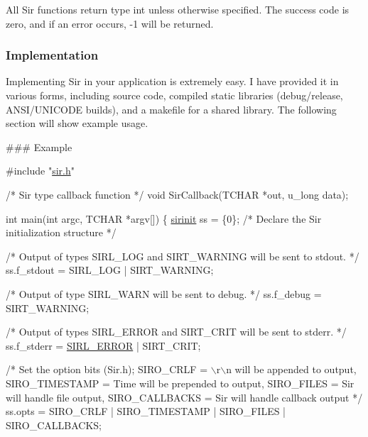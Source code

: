 All Sir functions return type int unless otherwise specified. The success code is zero, and if an error occurs, -\/1 will be returned.

\subsubsection*{Implementation}

Implementing Sir in your application is extremely easy. I have provided it in various forms, including source code, compiled static libraries (debug/release, A\+N\+S\+I/\+U\+N\+I\+C\+O\+DE builds), and a makefile for a shared library. The following section will show example usage.

\#\#\# Example 
\begin{DoxyCode}
\textcolor{preprocessor}{#include "\hyperlink{sir_8h}{sir.h}"}

\textcolor{comment}{/*}
\textcolor{comment}{  Sir type callback function}
\textcolor{comment}{*/}
\textcolor{keywordtype}{void} SirCallback(TCHAR *out, u\_long data);

\textcolor{keywordtype}{int} main(\textcolor{keywordtype}{int} argc, TCHAR *argv[]) \{
  \hyperlink{structsirinit}{sirinit} ss = \{0\}; \textcolor{comment}{/* Declare the Sir initialization structure */}

\textcolor{comment}{/*}
\textcolor{comment}{  Output of types SIRL\_LOG and SIRT\_WARNING}
\textcolor{comment}{  will be sent to stdout.}
\textcolor{comment}{ */}
  ss.f\_stdout = SIRL\_LOG | SIRT\_WARNING;

\textcolor{comment}{/*}
\textcolor{comment}{  Output of type SIRL\_WARN will be sent}
\textcolor{comment}{  to debug.}
\textcolor{comment}{ */}
  ss.f\_debug = SIRT\_WARNING;

\textcolor{comment}{/*}
\textcolor{comment}{  Output of types SIRL\_ERROR and SIRT\_CRIT}
\textcolor{comment}{  will be sent to stderr.}
\textcolor{comment}{ */}
  ss.f\_stderr = \hyperlink{sir_8h_a4a3303c67acd49bea38fd3565d458cb2a9c687f088db1de838ea5d5f8a8beed76}{SIRL\_ERROR} | SIRT\_CRIT;

\textcolor{comment}{/*}
\textcolor{comment}{  Set the option bits (Sir.h);}
\textcolor{comment}{  SIRO\_CRLF = \(\backslash\)r\(\backslash\)n will be appended to output,}
\textcolor{comment}{  SIRO\_TIMESTAMP = Time will be prepended to output,}
\textcolor{comment}{  SIRO\_FILES = Sir will handle file output,}
\textcolor{comment}{  SIRO\_CALLBACKS = Sir will handle callback output}
\textcolor{comment}{ */}
  ss.opts = SIRO\_CRLF | SIRO\_TIMESTAMP | SIRO\_FILES | SIRO\_CALLBACKS;


\end{DoxyCode}
